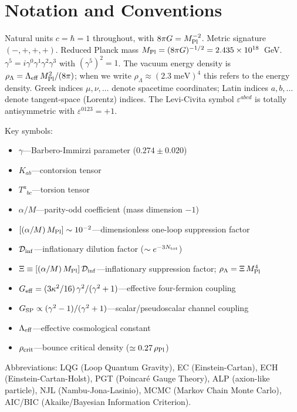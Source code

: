 \documentclass[aps,prd,twocolumn,superscriptaddress,showpacs,preprintnumbers,
  nofootinbib,longbibliography,floatfix]{revtex4-2}
\newcommand{\Leff}{\Lambda_{\rm eff}}
\newcommand{\Dinf}{\mathcal{D}_{\rm inf}}
\newcommand{\rhocrit}{\rho_{\rm crit}}
\newcommand{\rhoPl}{\rho_{\rm Pl}}
\newcommand{\MPl}{M_{\rm Pl}}
\newcommand{\BI}{\gamma}
\newcommand{\Geff}{G_{\rm eff}}
\newcommand{\Gsp}{G_{\rm SP}}
\begin{document}
\appendix

\section{Notation and Conventions}\label{app:notation}

Natural units $c=\hbar=1$ throughout, with $8\pi G = \MPl^{-2}$.
Metric signature $(-,+,+,+)$. Reduced Planck mass
$\MPl = (8\pi G)^{-1/2} = 2.435 \times 10^{18}$~GeV.
$\gamma^5 = i\gamma^0\gamma^1\gamma^2\gamma^3$ with
$(\gamma^5)^2 = 1$. The vacuum energy density is
$\rho_\Lambda = \Leff\,\MPl^2/(8\pi)$; when we write
$\rho_\Lambda \approx (2.3\;\text{meV})^4$ this refers to the energy
density. Greek indices $\mu,\nu,\ldots$ denote spacetime coordinates;
Latin indices $a,b,\ldots$ denote tangent-space (Lorentz) indices.
The Levi-Civita symbol $\varepsilon^{abcd}$ is totally antisymmetric
with $\varepsilon^{0123}=+1$.

Key symbols:
\begin{itemize}[leftmargin=*]
\item $\BI$---Barbero-Immirzi parameter ($0.274 \pm 0.020$)
\item $K_{ab}$---contorsion tensor
\item $T^a_{\;\;bc}$---torsion tensor
\item $\alpha/M$---parity-odd coefficient (mass dimension $-1$)
\item $[(\alpha/M)\,\MPl]\sim 10^{-2}$---dimensionless one-loop
  suppression factor
\item $\Dinf$---inflationary dilution factor ($\sim e^{-3N_{\rm tot}}$)
\item $\Xi\equiv[(\alpha/M)\,\MPl]\,\Dinf$---inflationary suppression
  factor; $\rho_\Lambda = \Xi\,\MPl^4$
\item $\Geff = (3\kappa^2/16)\,\BI^2/(\BI^2+1)$---effective four-fermion
  coupling
\item $\Gsp \propto (\BI^2-1)/(\BI^2+1)$---scalar/pseudoscalar channel
  coupling
\item $\Leff$---effective cosmological constant
\item $\rhocrit$---bounce critical density ($\simeq 0.27\,\rhoPl$)
\end{itemize}

Abbreviations: LQG (Loop Quantum Gravity), EC (Einstein-Cartan),
ECH (Einstein-Cartan-Holst), PGT (Poincar\'e Gauge Theory),
ALP (axion-like particle), NJL (Nambu-Jona-Lasinio),
MCMC (Markov Chain Monte Carlo), AIC/BIC (Akaike/Bayesian Information
Criterion).
\end{document}
